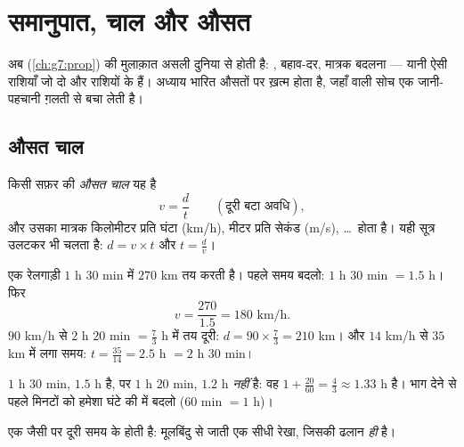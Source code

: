 \chapter{समानुपात, चाल और औसत}\label{ch:g8:speed}

अब  (\cref{ch:g7:prop}) की मुलाक़ात असली दुनिया से होती है:
, बहाव-दर, मात्रक बदलना --- यानी ऐसी राशियाँ जो दो और राशियों के
\emph{} हैं। अध्याय भारित औसतों पर ख़त्म होता है, जहाँ
 वाली सोच एक जानी-पहचानी ग़लती से बचा लेती है।

\section{औसत चाल}

\begin{definition}[औसत चाल]\label{def:g8:speed:def}
किसी सफ़र की \emph{औसत चाल} यह  है
\[
v = \frac{d}{t}
\qquad
\left(\text{दूरी बटा अवधि}\right),
\]
और उसका मात्रक किलोमीटर प्रति घंटा (km/h), मीटर प्रति सेकंड (m/s),
\dots\ होता है। यही सूत्र उलटकर भी चलता है: $d = v \times t$ और
$t = \frac{d}{v}$।
\end{definition}

\begin{example}\label{ex:g8:speed:basic}
एक रेलगाड़ी $1$ h $30$ min में $270$ km तय करती है। पहले समय बदलो:
$1$ h $30$ min $= 1.5$ h। फिर
\[
v = \frac{270}{1.5} = 180 \text{ km/h}.
\]
$90$ km/h से $2$ h $20$ min $= \frac73$ h में तय दूरी:
$d = 90 \times \frac73 = 210$ km। और $14$ km/h से $35$ km में लगा
समय: $t = \frac{35}{14} = 2.5$ h $= 2$ h $30$ min।
\end{example}

\begin{remark}[मिनट दशमलव नहीं होते]
$1$ h $30$ min, $1.5$ h है, पर $1$ h $20$ min, $1.2$ h \emph{नहीं}
है: वह $1 + \frac{20}{60} = \frac43 \approx 1.33$ h है। भाग देने से
पहले मिनटों को हमेशा घंटे की  में बदलो ($60$ min $= 1$ h)।
\end{remark}

\begin{omfigure}

{\small एक जैसी  पर दूरी समय के  होती है: मूलबिंदु से
जाती एक सीधी रेखा, जिसकी ढलान \emph{ही}  है।}
\end{omfigure}

